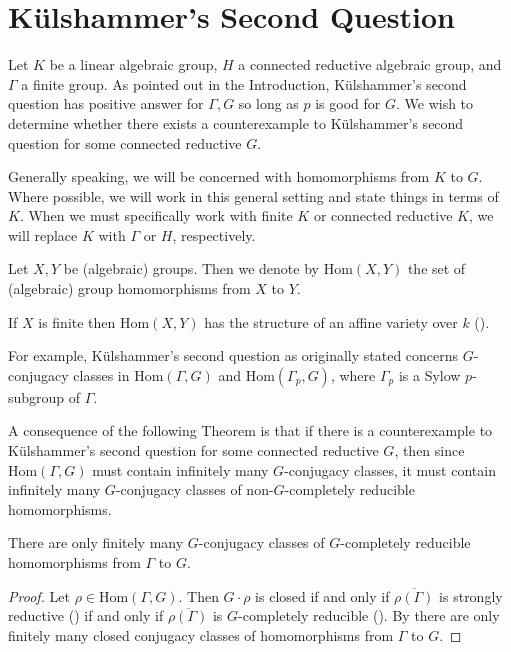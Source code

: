 
\chapter{K\"ulshammer's Second Question}
\label{Chapter4}

Let $K$ be a linear algebraic group, $H$ a connected reductive algebraic group, and $\Gamma$ a finite group.
As pointed out in the Introduction, K\"ulshammer's second question has positive answer for $\Gamma, G$ so long as $p$ is good for $G$. We wish to determine whether there exists a counterexample to K\"ulshammer's second question for some connected reductive $G$.

Generally speaking, we will be concerned with homomorphisms from $K$ to $G$. Where possible, we will work in this general setting and state things in terms of $K$. When we must specifically work with finite $K$ or connected reductive $K$, we will replace $K$ with $\Gamma$ or $H$, respectively.
\begin{definition} Let $X,Y$ be (algebraic) groups. Then we denote by $\mathrm{Hom}(X, Y)$ the set of (algebraic) group homomorphisms from $X$ to $Y$.
\end{definition}
\begin{remark}
	If $X$ is finite then $\mathrm{Hom}(X, Y)$ has the structure of an affine variety over $k$ (\cite[Section 3]{martin2000restrictions}).
\end{remark}

For example, K\"ulshammer's second question as originally stated concerns $G$-conjugacy classes in $\mathrm{Hom}(\Gamma, G)$ and $\mathrm{Hom}(\Gamma_p, G)$, where $\Gamma_p$ is a Sylow $p$-subgroup of $\Gamma$.

A consequence of the following Theorem  is that if there is a counterexample to K\"ulshammer's second question for some connected reductive $G$, then since $\mathrm{Hom}(\Gamma, G)$ must contain infinitely many $G$-conjugacy classes, it must contain infinitely many $G$-conjugacy classes of non-$G$-completely reducible homomorphisms.

\begin{theorem} \label{thm:finiteGCR} There are only finitely many $G$-conjugacy classes of $G$-completely reducible homomorphisms from $\Gamma$ to $G$.
\end{theorem}
\begin{proof}
Let $\rho\in \mathrm{Hom}(\Gamma, G)$. Then $G\cdot \rho$ is closed if and only if $\overline{\rho(\Gamma)}$ is strongly reductive (\cite[Proposition 2.16]{bate2005geometric}) if and only if $\overline{\rho(\Gamma)}$ is $G$-completely reducible (\cite[Theorem 3.1]{bate2005geometric}). By \cite[Theorem 1.2]{martin2003reductive} there are only finitely many closed conjugacy classes of homomorphisms from $\Gamma$ to $G$.
\end{proof}

